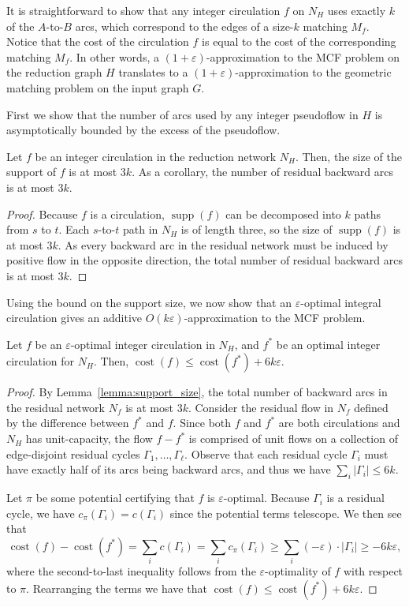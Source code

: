 \documentclass[a4paper,UKenglish]{socg-lipics-v2018}
\def\eps{\varepsilon}
\def\cost{\operatorname{cost}}
\def\supp{\operatorname{supp}}
\theoremstyle{plain}
\numberwithin{figure}{section}
\def\EMPH#1{\textbf{\emph{\boldmath #1}}}
\begin{document}
It is straightforward to show that any integer circulation $f$ on $N_H$ uses exactly
$k$ of the $A$-to-$B$ arcs, which correspond to the edges of a size-$k$
matching \EMPH{$M_f$}.
Notice that the cost of the circulation $f$ is equal to the cost of the corresponding matching $M_f$.
%
In other words, a $(1+\eps)$-approximation to the MCF problem on the reduction graph $H$ translates to a $(1+\eps)$-approximation to the geometric matching problem on the input graph $G$.

First we show that the number of arcs used by any integer pseudoflow
in $H$ is asymptotically bounded by the excess of the pseudoflow.

\begin{lemmarep}
\label{lemma:support_size}
Let $f$ be an integer circulation in the reduction network $N_H$.
Then, the size of the support of $f$ is at most $3k$.
As a corollary, the number of residual backward arcs is at most $3k$.
\end{lemmarep}

\begin{proof}
Because $f$ is a circulation, $\supp(f)$ can be decomposed into $k$  paths from $s$ to $t$.
Each $s$-to-$t$ path in $N_H$ is of length three, so the size of $\supp(f)$ is at most $3k$.
As every backward arc in the residual network must be induced by positive flow in the opposite direction,
the total number of residual backward arcs is at most $3k$.
\end{proof}

Using the bound on the support size, we now show that an $\eps$-optimal integral circulation gives an additive $O(k\eps)$-approximation to the MCF problem.

\begin{lemmarep}
\label{lemma:goldberg_cost_add}
Let $f$ be an $\eps$-optimal integer circulation in $N_H$, and $f^*$ be an optimal integer circulation for $N_H$.
Then, $\cost(f) \leq \cost(f^*) + 6k\eps$.
\end{lemmarep}

\begin{proof}
By Lemma~\ref{lemma:support_size}, the total number of backward arcs in the residual network $N_f$ is at most $3k$.
%
Consider the residual flow in $N_f$ defined by the difference between $f^*$ and $f$.
Since both $f$ and $f^*$ are both circulations and $N_H$ has unit-capacity,
the flow $f - f^*$ is comprised of unit flows on a collection of edge-disjoint residual cycles $\Gamma_1, \ldots, \Gamma_\ell$.
Observe that each residual cycle $\Gamma_i$ must have exactly half of its arcs being backward arcs, and thus we have $\sum_i |\Gamma_i| \leq 6k$.

Let $\pi$ be some potential certifying that $f$ is $\eps$-optimal.
Because $\Gamma_i$ is a residual cycle, we have $c_\pi(\Gamma_i) = c(\Gamma_i)$ since the potential terms telescope.
We then see that
\[
	\cost(f) - \cost(f^*)
	= \sum_i c(\Gamma_i)
	= \sum_i c_\pi(\Gamma_i)
	\geq \sum_i (-\eps) \cdot |\Gamma_i|
	\geq -6k\eps,
\]
where the second-to-last inequality follows from the $\eps$-optimality of $f$
with respect to $\pi$.
Rearranging the terms we have that $\cost(f) \leq \cost(f^*) + 6k\eps$.
\end{proof}
\end{document}
